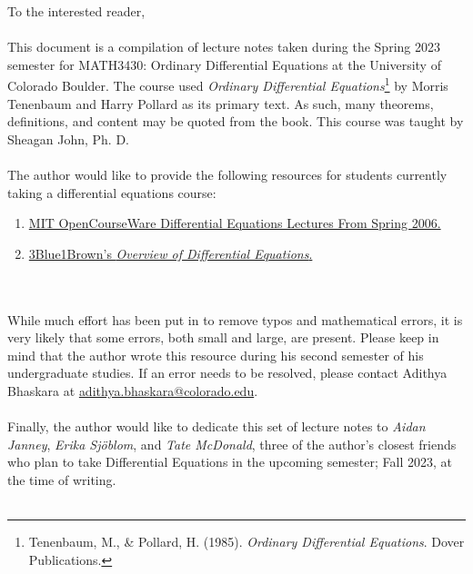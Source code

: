 To the interested reader,
\\
\\
This document is a compilation of lecture notes taken during the Spring 2023 semester for MATH3430: Ordinary Differential Equations at the University of Colorado Boulder. The course used \textit{Ordinary Differential Equations}\footnote{Tenenbaum, M., \& Pollard, H. (1985). \textit{Ordinary Differential Equations}. Dover Publications. } by Morris Tenenbaum and Harry Pollard as its primary text. As such, many theorems, definitions, and content may be quoted from the book. This course was taught by Sheagan John, Ph. D.
\\
\\
The author would like to provide the following resources for students currently taking a differential equations course:
\begin{enumerate}
    \item \href{https://www.youtube.com/playlist?list=PLEC88901EBADDD980}{MIT OpenCourseWare Differential Equations Lectures From Spring 2006.}
    \item \href{https://www.youtube.com/playlist?list=PLZHQObOWTQDNPOjrT6KVlfJuKtYTftqH6}{3Blue1Brown's \textit{Overview of Differential Equations}.}
\end{enumerate}
\vphantom
\\
\\
While much effort has been put in to remove typos and mathematical errors, it is very likely that some errors, both small and large, are present. Please keep in mind that the author wrote this resource during his second semester of his undergraduate studies. If an error needs to be resolved, please contact Adithya Bhaskara at \href{mailto:adithya.bhaskara@colorado.edu}{adithya.bhaskara@colorado.edu}.
\\
\\
Finally, the author would like to dedicate this set of lecture notes to \textit{Aidan Janney}, \textit{Erika Sj\"{o}blom}, and \textit{Tate McDonald}, three of the author's closest friends who plan to take Differential Equations in the upcoming semester; Fall 2023, at the time of writing.
\\
\\
\vfill
{}